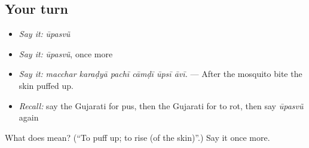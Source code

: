 \subsection*{Your turn}
\begin{itemize}
\raggedright
  \item \emph{Say it:} \emph{ūpasvũ}
  \item \emph{Say it:} \emph{ūpasvũ}, once more
  \item \emph{Say it:} \emph{macchar karaḍyā pachī cāmḍī ūpsī āvī.} — After the mosquito bite the skin puffed up.
  \item \emph{Recall:} say the Gujarati for pus, then the Gujarati for to rot, then say \emph{ūpasvũ} again
\end{itemize}

\begin{tcolorbox}[breakable,colback=teal!4,colframe=teal!35!black,title={Before you move on}]
What does  mean? (\textquotedblleft{}To puff up; to rise (of the skin)\textquotedblright{}.) Say it once more.
\end{tcolorbox}
